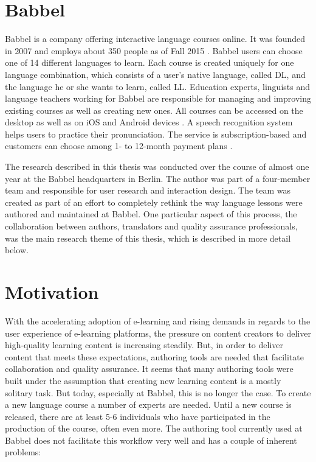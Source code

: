 \section{Babbel}
Babbel is a company offering interactive language courses online. It was founded in 2007 and employs about 350 people as of Fall 2015 \cite{_babbel_????}. Babbel users can choose one of 14 different languages to learn. Each course is created uniquely for one language combination, which consists of a user's native language, called \ac{DL}, and the language he or she wants to learn, called \ac{LL}. Education experts, linguists and language teachers working for Babbel are responsible for managing and improving existing courses as well as creating new ones. All courses can be accessed on the desktop as well as on iOS and Android devices \cite{_learn_????}. A speech recognition system helps users to practice their pronunciation. The service is subscription-based and customers can choose among 1- to 12-month payment plans \cite{_prices_????}.

The research described in this thesis was conducted over the course of almost one year at the Babbel headquarters in Berlin. The author was part of a four-member team and responsible for user research and interaction design. The team was created as part of an effort to completely rethink the way language lessons were authored and maintained at Babbel. One particular aspect of this process, the collaboration between authors, translators and quality assurance professionals, was the main research theme of this thesis, which is described in more detail below.

\section{Motivation} %
With the accelerating adoption of e-learning and rising demands in regards to the user experience of e-learning platforms, the pressure on content creators to deliver high-quality learning content is increasing steadily. But, in order to deliver content that meets these expectations, authoring tools are needed that facilitate collaboration and quality assurance. It seems that many authoring tools were built under the assumption that creating new learning content is a mostly solitary task. But today, especially at Babbel, this is no longer the case. To create a new language course a number of experts are needed. Until a new course is released, there are at least 5-6 individuals who have participated in the production of the course, often even more. The authoring tool currently used at Babbel does not facilitate this workflow very well and has a couple of inherent problems:

